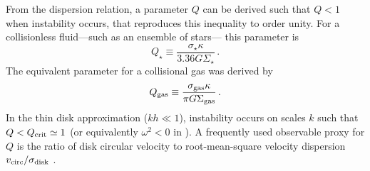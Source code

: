 \IfFileExists{emulateapjlegacy.cls}{\documentclass[iop]{emulateapjlegacy}}{\documentclass[iop]{emulateapj}}
\begin{document}
From the dispersion relation, a parameter $Q$ can be derived such that $Q < 1$ when instability occurs, that reproduces this inequality to order unity. For a collisionless fluid---such as an ensemble of stars--- this parameter is \citep{Toomre64a}
\begin{equation}
Q_{\star} \equiv\frac{\sigma_{\star}\kappa}{3.36 G \Sigma_{\star}}\,.
\end{equation}
The equivalent parameter for a collisional gas was derived by \citet{Goldreich65a}
\begin{equation}
Q_{\rm gas}\equiv\frac{\sigma_{\rm gas}\kappa}{\pi G \Sigma_{\rm gas}}\,.
\label{eqn:Q}
\end{equation}
In the thin disk approximation ($kh\ll1$), instability occurs on scales $k$ such that $Q < Q_{\rm crit}\simeq1$ (or equivalently $\omega^2 < 0$ in ). A frequently used observable proxy for $Q$ is the ratio of disk circular velocity to root-mean-square velocity dispersion $v_{\rm circ}/\sigma_{\rm disk}$ \citep[e.g.,][]{GarciaBurillo03a, Genzel11a, Kassin12a, Leung19a}.
%
\end{document}
